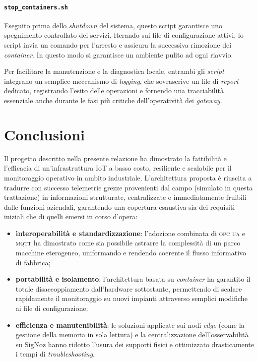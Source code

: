 \documentclass[12pt]{article}
\begin{document}
    \paragraph{\texttt{stop\_containers.sh}} 
    Eseguito prima dello \textit{shutdown} del sistema, questo script garantisce uno spegnimento controllato dei servizi. Iterando sui file di configurazione attivi, lo script invia un comando per l'arresto e assicura la successiva rimozione dei \textit{container}. In questo modo si garantisce un ambiente pulito ad ogni riavvio. \newline
    
    Per facilitare la manutenzione e la diagnostica locale, entrambi gli \textit{script} integrano un semplice meccanismo di \textit{logging}, che sovrascrive un file di \textit{report} dedicato, registrando l'esito delle operazioni e fornendo una tracciabilità essenziale anche durante le fasi più critiche dell'operatività dei \textit{gateway}.

    \section{Conclusioni}

    Il progetto descritto nella presente relazione ha dimostrato la fattibilità e l'efficacia di un'infrastruttura IoT a basso costo, resiliente e scalabile per il monitoraggio operativo in ambito industriale.
    L'architettura proposta è riuscita a tradurre con successo telemetrie grezze provenienti dal campo (simulato in questa trattazione) in informazioni strutturate, centralizzate e immediatamente fruibili dalle funzioni aziendali, garantendo una copertura esaustiva sia dei requisiti iniziali che di quelli emersi in corso d'opera:
    
    \begin{itemize}
        \item \textbf{interoperabilità e standardizzazione}: l'adozione combinata di \textsc{opc ua} e \textsc{mqtt} ha dimostrato come sia possibile astrarre la complessità di un parco macchine eterogeneo, uniformando e rendendo coerente il flusso informativo di fabbrica;
        \item \textbf{portabilità e isolamento}: l'architettura basata su \textit{container} ha garantito il totale disaccoppiamento dall'hardware sottostante, permettendo di scalare rapidamente il monitoraggio su nuovi impianti attraverso semplici modifiche ai file di configurazione;
        \item \textbf{efficienza e manutenibilità}: le soluzioni applicate sui nodi \textit{edge} (come la gestione della memoria in sola lettura) e la centralizzazione dell'osservabilità su SigNoz hanno ridotto l'usura dei supporti fisici e ottimizzato drasticamente i tempi di \textit{troubleshooting}.
    \end{itemize}
        
\end{document}
